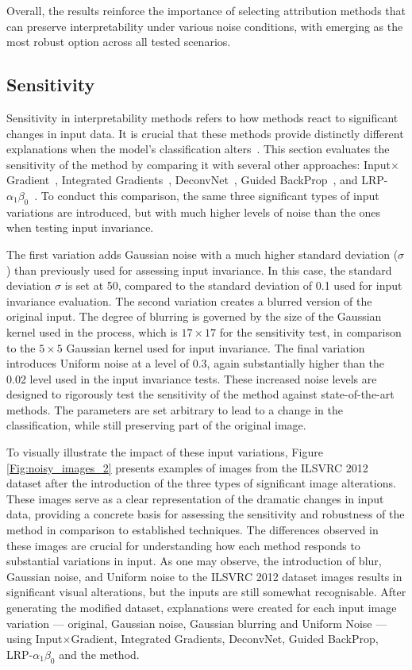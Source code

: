 Overall, the results reinforce the importance of selecting attribution methods that can preserve interpretability under various noise conditions, with \CTC\/ emerging as the most robust option across all tested scenarios.

\subsection{Sensitivity}
Sensitivity in interpretability methods refers to how methods react to significant changes in input data. It is crucial that these methods provide distinctly different explanations when the model's classification alters~\cite{NielsenDRRB22}. This section evaluates the sensitivity of the \CTC\/ method by comparing it with several other approaches: Input$\times$Gradient~\cite{SimonyanVZ13}, Integrated Gradients~\cite{SundararajanTY17}, DeconvNet~\cite{ZeilerKTF10}, Guided BackProp~\cite{SpringenbergDBR14}, and LRP-$\alpha_1\beta_0$~\cite{bach2015pixel}. To conduct this comparison, the same three significant types of input variations are introduced, but with much higher levels of noise than the ones when testing input invariance.

The first variation adds Gaussian noise with a much higher standard deviation ($\sigma$) than previously used for assessing input invariance. In this case, the standard deviation $\sigma$ is set at 50, compared to the standard deviation of 0.1 used for input invariance evaluation. The second variation creates a blurred version of the original input. The degree of blurring is governed by the size of the Gaussian kernel used in the process, which is $17 \times 17$ for the sensitivity test, in comparison to the $5 \times 5$ Gaussian kernel used for input invariance. The final variation introduces Uniform noise at a level of 0.3, again substantially higher than the 0.02 level used in the input invariance tests. These increased noise levels are designed to rigorously test the sensitivity of the \CTC\/ method against state-of-the-art methods. The parameters are set arbitrary to lead to a change in the classification, while still preserving part of the original image.

To visually illustrate the impact of these input variations, Figure \ref{Fig:noisy_images_2} presents examples of images from the ILSVRC 2012 dataset after the introduction of the three types of significant image alterations. These images serve as a clear representation of the dramatic changes in input data, providing a concrete basis for assessing the sensitivity and robustness of the \CTC\/ method in comparison to established techniques. The differences observed in these images are crucial for understanding how each method responds to substantial variations in input. As one may observe, the introduction of blur, Gaussian noise, and Uniform noise to the ILSVRC 2012 dataset images results in significant visual alterations, but the inputs are still somewhat recognisable. After generating the modified dataset, explanations were created for each input image variation --- original, Gaussian noise, Gaussian blurring and Uniform Noise --- using Input$\times$Gradient, Integrated Gradients, DeconvNet, Guided BackProp, LRP-$\alpha_1\beta_0$ and the \CTC\/ method.  

